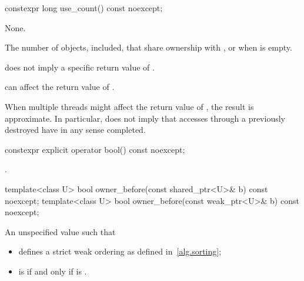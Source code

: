 %
\begin{itemdecl}
constexpr long use_count() const noexcept;
\end{itemdecl}

\begin{itemdescr}
\pnum
\sync
None.

\pnum
\returns
The number of  objects,  included,
that share ownership with , or  when  is
empty.

\pnum
\begin{note}
does not imply a specific return value of .
\end{note}

\pnum
\begin{note}
can affect the return value of .
\end{note}

\pnum
\begin{note}
When multiple threads
might affect the return value of ,
the result is approximate.
In particular,  does not imply that accesses through
a previously destroyed  have in any sense completed.
\end{note}
\end{itemdescr}

%
\begin{itemdecl}
constexpr explicit operator bool() const noexcept;
\end{itemdecl}

\begin{itemdescr}
\pnum
\returns
{}.
\end{itemdescr}

%
\begin{itemdecl}
template<class U> bool owner_before(const shared_ptr<U>& b) const noexcept;
template<class U> bool owner_before(const weak_ptr<U>& b) const noexcept;
\end{itemdecl}

\begin{itemdescr}
\pnum
\returns
An unspecified value such that
\begin{itemize}
\item
{} defines a strict weak ordering as defined in~\ref{alg.sorting};
\item
{} is 
if and only if  is .
\end{itemize}
\end{itemdescr}

